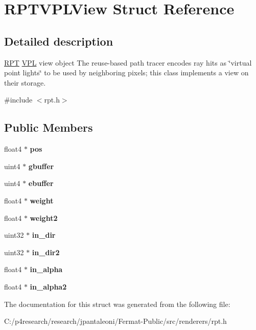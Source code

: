 \hypertarget{struct_r_p_t_v_p_l_view}{}\section{R\+P\+T\+V\+P\+L\+View Struct Reference}
\label{struct_r_p_t_v_p_l_view}


\subsection{Detailed description}
\hyperlink{struct_r_p_t}{R\+PT} \hyperlink{struct_v_p_l}{V\+PL} view object The reuse-\/based path tracer encodes ray hits as \char`\"{}virtual point lights\char`\"{} to be used by neighboring pixels; this class implements a view on their storage. 

{\ttfamily \#include $<$rpt.\+h$>$}

\subsection*{Public Members}
\begin{DoxyCompactItemize}
\item 
\mbox{\label{struct_r_p_t_v_p_l_view_a7137ca1e4104a64fc2f3743401ae2e91}} 
float4 $\ast$ {\bfseries pos}
\item 
\mbox{\label{struct_r_p_t_v_p_l_view_a94e7f8734e6b1f37c351c170139cee9c}} 
uint4 $\ast$ {\bfseries gbuffer}
\item 
\mbox{\label{struct_r_p_t_v_p_l_view_af3f98b47fcd244a54bcc356d3b8da9cd}} 
uint4 $\ast$ {\bfseries ebuffer}
\item 
\mbox{\label{struct_r_p_t_v_p_l_view_a95264a07e4bb8584416ea00649c89dbe}} 
float4 $\ast$ {\bfseries weight}
\item 
\mbox{\label{struct_r_p_t_v_p_l_view_a46aed2b359e756a93bb44e7f3269b2d6}} 
float4 $\ast$ {\bfseries weight2}
\item 
\mbox{\label{struct_r_p_t_v_p_l_view_af8df073dfeec4580fd56b94bc367d7be}} 
uint32 $\ast$ {\bfseries in\+\_\+dir}
\item 
\mbox{\label{struct_r_p_t_v_p_l_view_a0d82e039496b7c6b0bd17f7cdaf2c607}} 
uint32 $\ast$ {\bfseries in\+\_\+dir2}
\item 
\mbox{\label{struct_r_p_t_v_p_l_view_acb810f5cd1d9da61e9fce12281b8a142}} 
float4 $\ast$ {\bfseries in\+\_\+alpha}
\item 
\mbox{\label{struct_r_p_t_v_p_l_view_a4b380695cb6a190c58e9bdfa21a3755a}} 
float4 $\ast$ {\bfseries in\+\_\+alpha2}
\end{DoxyCompactItemize}


The documentation for this struct was generated from the following file\+:\begin{DoxyCompactItemize}
\item 
C\+:/p4research/research/jpantaleoni/\+Fermat-\/\+Public/src/renderers/rpt.\+h\end{DoxyCompactItemize}
